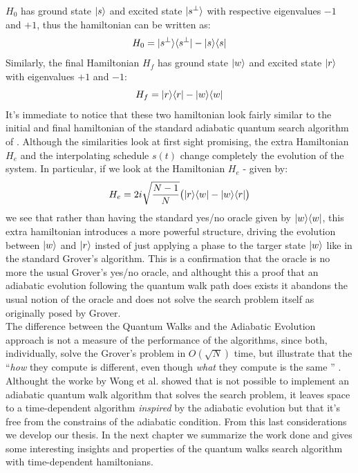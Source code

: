 $H_0$ has ground state ${|{s}\rangle}$ and excited state ${|{s^\perp}\rangle}$ with respective eigenvalues $-1$ and $+1$, thus the hamiltonian can be written as:
\begin{equation}
  H_0  = {|{s^\perp}\rangle}{\langle{s^\perp}|} - {|{s}\rangle}{\langle{s}|}
\end{equation}
Similarly, the final Hamiltonian $H_f$ has ground state ${|{w}\rangle}$ and excited state ${|{r}\rangle}$ with eigenvalues $+1$ and $-1$:
\begin{equation}
  H_f =  {|{r}\rangle}{\langle{r}|} - {|{w}\rangle}{\langle{w}|}
\end{equation}
It's immediate to notice that these two hamiltonian look fairly similar to the initial and final hamiltonian of the standard adiabatic quantum search algorithm of . Although the similarities look at first sight promising, the extra Hamiltonian $H_e$ and the interpolating schedule $s(t)$ change completely the evolution of the system. In particular, if we look at the Hamiltonian $H_e$ - given by:
\begin{equation}
  H_e = 2i\sqrt{\frac{N-1}{N}}\big({|{r}\rangle}{\langle{w}|} - {|{w}\rangle}{\langle{r}|}\big)
\end{equation}
we see that rather than having the standard yes/no oracle given by ${|{w}\rangle}{\langle{w}|}$, this extra hamiltonian introduces a more powerful structure, driving the evolution between ${|{w}\rangle}$ and ${|{r}\rangle}$ insted of just applying a phase to the targer state ${|{w}\rangle}$ like in the standard Grover's algorithm. This is a confirmation that the oracle is no more the usual Grover's yes/no oracle, and althought this a proof that an adiabatic evolution following the quantum walk path does exists it abandons the usual notion of the oracle and does not solve the search problem itself as originally posed by Grover. \\

\noindent
The difference between the Quantum Walks and the Adiabatic Evolution approach is not a measure of the performance of the algorithms, since both, individually, solve the Grover's problem in $O(\sqrt{N})$ time, but illustrate that the ``\textit{how} they compute is different, even though \textit{what} they compute is the same '' \cite{Wong2016}.\\

\noindent
Althought the worke by Wong et al. showed that is not possible to implement an adiabatic quantum walk algorithm that solves the search problem, it leaves space to a time-dependent algorithm \textit{inspired} by the adiabatic evolution but that it's free from the constrains of the adiabatic condition. From this last considerations we develop our thesis. In the next chapter we summarize the work done and gives some interesting insights and properties of the quantum walks search algorithm with time-dependent hamiltonians.


%
